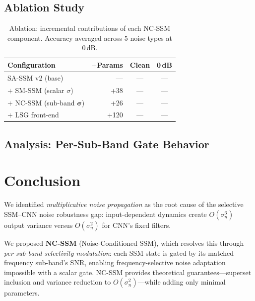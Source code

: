 \documentclass{Interspeech}
\begin{document}

\subsection{Ablation Study}

\begin{table}[t]
\centering
\caption{Ablation: incremental contributions of each NC-SSM component. Accuracy averaged across 5 noise types at 0\,dB.}
\label{tab:ablation}
\small
\setlength{\tabcolsep}{4pt}
\begin{tabular}{lrcc}
\toprule
\textbf{Configuration} & $+$\textbf{Params} & \textbf{Clean} & \textbf{0\,dB} \\
\midrule
SA-SSM v2 (base) & --- & --- & --- \\
$+$ SM-SSM (scalar $\sigma$) & +38 & --- & --- \\
$+$ NC-SSM (sub-band $\bm{\sigma}$) & +26 & --- & --- \\
$+$ LSG front-end & +120 & --- & --- \\
\bottomrule
\end{tabular}
\end{table}


\subsection{Analysis: Per-Sub-Band Gate Behavior}


\section{Conclusion}

We identified \emph{multiplicative noise propagation} as the root cause of the selective SSM--CNN noise robustness gap: input-dependent dynamics create $O(\sigma_n^6)$ output variance versus $O(\sigma_n^2)$ for CNN's fixed filters.

We proposed \textbf{NC-SSM} (Noise-Conditioned SSM), which resolves this through \emph{per-sub-band selectivity modulation}: each SSM state is gated by its matched frequency sub-band's SNR, enabling frequency-selective noise adaptation impossible with a scalar gate.
NC-SSM provides theoretical guarantees---superset inclusion and variance reduction to $O(\sigma_n^2)$---while adding only minimal parameters.
\end{document}
